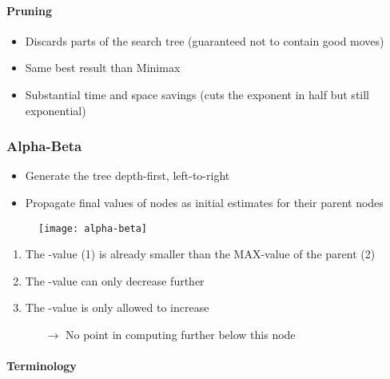 \paragraph{Pruning}

\begin{itemize}
\item Discards parts of the search tree (guaranteed not to contain good moves)
\item Same best result than Minimax
\item Substantial time and space savings (cuts the exponent in half but still exponential)
\end{itemize}

\subsubsection{Alpha-Beta}

\begin{itemize}
\item Generate the tree depth-first, left-to-right
\item Propagate final values of nodes as initial estimates for their parent nodes
\end{itemize}
\begin{minipage}{0.4\textwidth}
	\begin{figure}[H]
		\centering
		\texttt{[image: alpha-beta]}
	\end{figure}
\end{minipage}
\begin{minipage}{0.6\textwidth}
	\begin{enumerate}
	\item The -value (1) is already smaller than the MAX-value of the parent (2)
	\item The -value can only decrease further
	\item The -value is only allowed to increase
		\begin{enumerate}
		\item[$\rightarrow$] No point in computing further below this node
		\end{enumerate}
	\end{enumerate}
\end{minipage}

\paragraph{Terminology}

